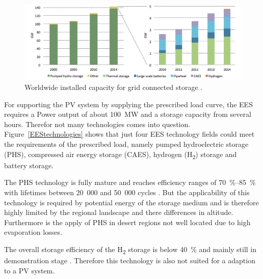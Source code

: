 \begin{figure}[htbp]  
\centering
\includegraphics[width=1\linewidth]{FIG/EESgridCapacity}
\caption[Worldwide installed capacity for grid connected storage.]{Worldwide installed capacity for grid connected storage \cite{IEA2015}.}\label{EESgridCapacity}
\end{figure}
For supporting the PV system by supplying the prescribed load curve, the EES requires a Power output of about \SI{100}{\mega\watt} and a storage capacity from several hours. Therefor not many technologies comes into question. Figure~\ref{EEStechnologies} shows that just four EES technology fields could meet the requirements of the prescribed load, namely pumped hydroelectric storage (PHS), compressed air energy storage (CAES), hydrogen (H\textsubscript{2}) storage and battery storage.

The PHS technology is fully mature and reaches efficiency ranges of \SIrange{70}{85}{\percent} with lifetimes between 20~000 and 50~000 cycles \cite{IEA2014c}. But the applicability of this technology is required by potential energy of the storage medium and is therefore highly limited by the regional landscape and there differences in altitude. Furthermore is the apply of PHS in desert regions not well located due to high evaporation losses.

The overall storage efficiency of the H\textsubscript{2} storage is below \SI{40}{\percent} and mainly still in demonstration stage \cite{IEA2014c,IEA2015}. Therefore this technology is also not suited for a adaption to a PV system.

